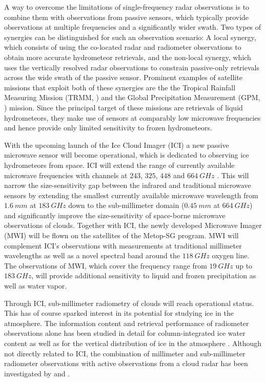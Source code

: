 \documentclass[journal abbreviation, manuscript]{copernicus}
\begin{document}
A way to overcome the limitations of single-frequency radar observations is to
combine them with observations from passive sensors, which typically provide
observations at multiple frequencies and a significantly wider swath. Two types
of synergies can be distinguished for such an observation scenario: A local
synergy, which consists of using the co-located radar and radiometer
observations to obtain more accurate hydrometeor retrievals, and the non-local
synergy, which uses the vertically resolved radar observations to constrain
passive-only retrievals across the wide swath of the passive sensor. Prominent
examples of satellite missions that exploit both of these synergies are the the
Tropical Rainfall Measuring Mission (TRMM, \citet{kummerow98, grecu04}) and the
Global Precipitation Measurement (GPM, \cite{hou14, grecu16, munchak11,
  kummerow15}) mission. Since the principal target of these missions are
retrievals of liquid hydrometeors, they make use of sensors at comparably low
microwave frequencies and hence provide only limited sensitivity to frozen
hydrometeors.

With the upcoming launch of the Ice Cloud Imager (ICI) a new passive microwave
sensor will become operational, which is dedicated to observing ice hydrometeors
from space. ICI will extend the range of currently available microwave
frequencies with channels at $243$, $325$, $448$ and $664\ \unit{GHz}$
\citep{eriksson20}. This will narrow the size-sensitivity gap between the
infrared and traditional microwave sensors by extending the smallest currently
available microwave wavelength from $1.6\ \unit{mm}$ at $183\ \unit{GHz}$ down
to the sub-millimeter domain ($0.45\ \unit{mm}$ at $664\ \unit{GHz}$) and
significantly improve the size-sensitivity of space-borne microwave observations
of clouds. Together with ICI, the newly developed Microwave Imager (MWI) will be
flown on the satellites of the Metop-SG program. MWI will complement ICI's
observations with measurements at traditional millimeter wavelengths as well as
a novel spectral band around the $118\ \unit{GHz}$ oxygen line. The observations
of MWI, which cover the frequency range from $19\ \unit{GHz}$ up to
$183\ \unit{GHz}$, will provide additional sensitivity to liquid and frozen
precipitation as well as water vapor.

Through ICI, sub-millimeter radiometry of clouds will reach operational status.
This has of course sparked interest in its potential for studying ice in the
atmosphere. The information content and retrieval performance of radiometer
observations alone has been studied in detail for column-integrated ice water
content \citep{jimenez07, wang17, brath18a, eriksson20} as well as for the
vertical distribution of ice in the atmosphere \citep{birman17, grutzun18,
  aires19}. Although not directly related to ICI, the combination of millimeter
and sub-millimeter radiometer observations with active observations from a cloud
radar has been investigated by \cite{evans05} and \cite{jiang19}.
\end{document}
